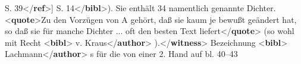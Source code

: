 \begin{shaded}
\hspace*{1em}\hspace*{1em}\hspace*{1em}\hspace*{1em}\hspace*{1em}\hspace*{1em} S. 39{</\textbf{ref}>}] S. 14{</\textbf{bibl}>}). Sie enthält 34 namentlich\mbox{}\newline 
\hspace*{1em}\hspace*{1em} genannte Dichter. {<\textbf{quote}>}Zu den Vorzügen von A gehört, daß\mbox{}\newline 
\hspace*{1em}\hspace*{1em}\hspace*{1em}\hspace*{1em} sie kaum je bewußt geändert hat, so daß sie für\mbox{}\newline 
\hspace*{1em}\hspace*{1em}\hspace*{1em}\hspace*{1em} manche Dichter ... oft den besten Text liefert{</\textbf{quote}>} (so wohl mit\mbox{}\newline 
\hspace*{1em}\hspace*{1em} Recht {<\textbf{bibl}>}\mbox{}\newline 
\hspace*{1em}\hspace*{1em}v. Kraus{</\textbf{author}>}\mbox{}\newline 
\hspace*{1em}).{</\textbf{witness}>}\mbox{}\newline 
{}Bezeichnung {<\textbf{bibl}>}\mbox{}\newline 
\hspace*{1em}\hspace*{1em}Lachmann{</\textbf{author}>}\mbox{}\newline 
\hspace*{1em}s für die von einer 2. Hand auf bl. 40–43\mbox{}\newline 

\end{shaded}

